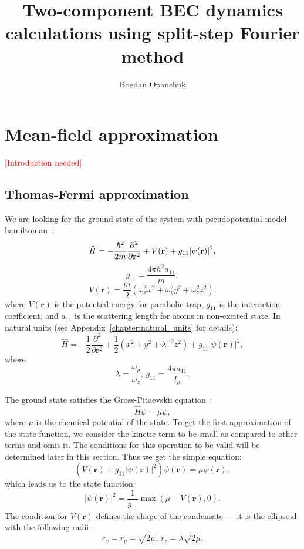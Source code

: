 \documentclass[12pt,notitlepage]{report}
\title{Two-component BEC dynamics calculations using split-step Fourier method}
\author{Bogdan Opanchuk}
\begin{document}
\maketitle

\chapter{Mean-field approximation}
\label{chapter:mean-field}

\textcolor{red}{[Introduction needed]}

\section{Thomas-Fermi approximation}

We are looking for the ground state of the system with pseudopotential model hamiltonian~\cite{pitaevskii_bec}:
\[ 
\hat{H} = -\frac{\hbar^2}{2m} \frac{\partial^2}{\partial \mathbf{r}^2} + \\
V(\mathbf{r}) + g_{11} \lvert \psi(\mathbf{r}) \rvert^2,
\]
\[ g_{11} = \frac{4 \pi \hbar^2 a_{11}}{m}, \]
\begin{equation}
\label{thomas-fermi:trap_potential}
V(\mathbf{r}) = \frac{m}{2} \left( \omega_x^2 x^2 + \omega_y^2 y^2 + \omega_z^2 z^2 \right).
\end{equation}
where $V(\mathbf{r})$ is the potential energy for parabolic trap, $g_{11}$ is the interaction coefficient,
and $a_{11}$ is the scattering length for atoms in non-excited state. In natural units
(see Appendix~\ref{chapter:natural_units} for details):
\[
\hat{H} = -\frac{1}{2} \frac{\partial^2}{\partial \mathbf{r}^2} + 
\frac{1}{2} \left( x^2 + y^2 + \lambda^{-2} z^2 \right) + g_{11} \lvert \psi(\mathbf{r}) \rvert^2,
\]
where
\[ \lambda = \frac{\omega_\rho}{\omega_z},\, g_{11} = \frac{4 \pi a_{11}}{l_\rho}. \]

The ground state satisfies the Gross-Pitaevskii equation~\cite{pitaevskii_bec}:
\begin{equation}
\label{thomas-fermi:exact_eqn}
\hat{H} \psi = \mu \psi,
\end{equation}
where $\mu$ is the chemical potential of the state.
To get the first approximation of the state function, we consider the kinetic term to be small as compared to other terms and omit it.
The conditions for this operation to be valid will be determined later in this section.
Thus we get the simple equation:
\[ \left( V(\mathbf{r}) + g_{11} \lvert \psi(\mathbf{r}) \rvert^2 \right) \psi(\mathbf{r}) = \mu \psi(\mathbf{r}), \]
which leads us to the state function:
\begin{equation}
\label{thomas-fermi:wave_function}
\lvert \psi(\mathbf{r}) \rvert^2 = \frac{1}{g_{11}} \max \left( \mu - V(\mathbf{r}), 0 \right).
\end{equation}
The condition for $V(\mathbf{r})$ defines the shape of the condensate --- it is the ellipsoid with the following radii:
\begin{equation}
\label{thomas-fermi:condensate_size}
r_x = r_y = \sqrt{2\mu},\, r_z = \lambda \sqrt{2\mu}.
\end{equation}
\end{document}

